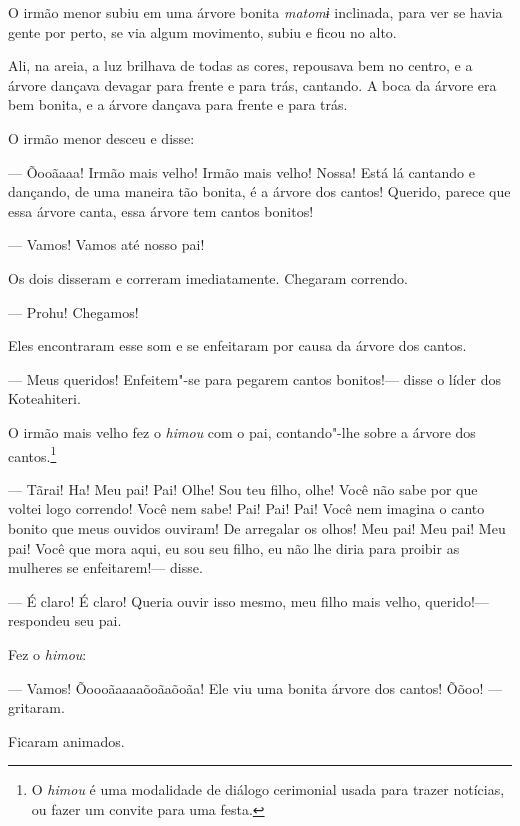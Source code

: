 O irmão menor subiu em uma árvore bonita \emph{matomɨ} inclinada, para
ver se havia gente por perto, se via algum movimento, subiu e ficou
no alto. 

Ali, na areia, a luz brilhava de todas as cores, repousava bem no
centro, e a árvore dançava devagar para frente e para trás, cantando. A boca da árvore era bem bonita, e a árvore dançava para frente e para
trás. 

O irmão menor desceu e disse:

--- Õooãaaa! Irmão mais velho! Irmão mais velho! Nossa! Está lá cantando
e dançando, de uma maneira tão bonita, é a árvore dos cantos! Querido,
parece que essa árvore canta, essa árvore tem cantos bonitos! 

--- Vamos! Vamos até nosso pai! 

Os dois disseram e correram imediatamente. Chegaram correndo.

--- Prohu! Chegamos! 

Eles encontraram esse som e se enfeitaram por causa da árvore dos cantos. 

--- Meus queridos! Enfeitem"-se para pegarem cantos bonitos!--- disse o
líder dos Koteahiteri. 

O irmão mais velho fez o \emph{himou} com o pai, contando"-lhe sobre a
árvore dos cantos.\footnote{  O \emph{himou} é uma modalidade de diálogo cerimonial usada para trazer notícias, ou fazer um convite para uma festa.}

--- Tãrai! Ha! Meu pai! Pai! Olhe! Sou teu filho, olhe! Você não sabe
por que voltei logo correndo! Você nem sabe! Pai! Pai! Pai! Você nem
imagina o canto bonito que meus ouvidos ouviram! De arregalar os olhos!
Meu pai! Meu pai! Meu pai! Você que mora aqui, eu sou seu filho, eu não
lhe diria para proibir as mulheres se enfeitarem!--- disse. 

--- É claro! É claro! Queria ouvir isso mesmo, meu filho mais velho,
querido!--- respondeu seu pai. 

Fez o \emph{himou}: 

--- Vamos! Õoooãaaaaõoãaõoãa! Ele viu uma bonita árvore dos cantos!
Õõoo! --- gritaram. 

Ficaram animados.

 

